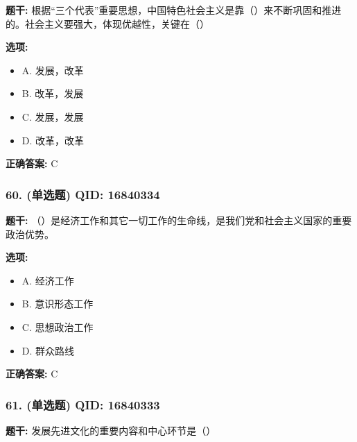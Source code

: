 \documentclass[12pt,UTF8]{ctexart}
\begin{document}
\textbf{题干:}
根据“三个代表”重要思想，中国特色社会主义是靠（）来不断巩固和推进的。社会主义要强大，体现优越性，关键在（）

\textbf{选项:}
\begin{itemize}[leftmargin=*]

  \item A. 发展，改革

  \item B. 改革，发展

  \item C. 发展，发展

  \item D. 改革，改革

\end{itemize}

\textbf{正确答案:}
C

\vspace{0.3em}\hrulefill\vspace{0.7em}

\subsubsection*{60. (单选题) \small QID: 16840334}

\textbf{题干:}
（）是经济工作和其它一切工作的生命线，是我们党和社会主义国家的重要政治优势。

\textbf{选项:}
\begin{itemize}[leftmargin=*]

  \item A. 经济工作

  \item B. 意识形态工作

  \item C. 思想政治工作

  \item D. 群众路线

\end{itemize}

\textbf{正确答案:}
C

\vspace{0.3em}\hrulefill\vspace{0.7em}

\subsubsection*{61. (单选题) \small QID: 16840333}

\textbf{题干:}
发展先进文化的重要内容和中心环节是（）
\end{document}
